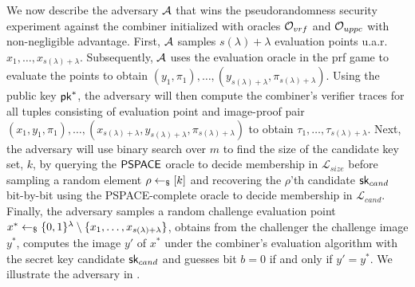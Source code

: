 We now describe the adversary $\mathcal{A}$ that wins the pseudorandomness security experiment 
against the combiner initialized with oracles $\mathcal{O}_{vrf}$ and $\mathcal{O}_{uppc}$ with non-negligible advantage.
First, $\mathcal{A}$ samples $s(\lambda) + \lambda$ evaluation points u.a.r. $x_1, \ldots, x_{s(\lambda) + \lambda}$.
Subsequently, $\mathcal{A}$ uses the evaluation oracle in the prf game to evaluate the points to obtain 
$(y_1, \pi_1), \ldots, (y_{s(\lambda) + \lambda}, \pi_{s(\lambda) + \lambda})$. Using the public key $\textup{\textsf{pk}}^*$,
the adversary will then compute the combiner's verifier traces for all tuples consisting of evaluation point and image-proof pair
$(x_1, y_1, \pi_1), \ldots, (x_{s(\lambda) + \lambda}, y_{s(\lambda) + \lambda}, \pi_{s(\lambda) + \lambda})$ to obtain 
$\tau_1, \ldots, \tau_{s(\lambda) + \lambda}$. Next, the adversary will use binary search over $m$ to find the size 
of the candidate key set, $k$, by querying the $\textup{\textsf{PSPACE}}$ oracle to decide membership in $\mathcal L_{size}$ before 
sampling a random element $\rho \gets_\$ [k]$ and recovering the $\rho$'th candidate $\textup{\textsf{sk}}_{cand}$ bit-by-bit using the PSPACE-complete oracle
to decide membership in $\mathcal L_{cand}$.
Finally, the adversary samples a random challenge evaluation point $x^* \gets_\$ \{0,1\}^\lambda \setminus \{x_1, \ldots, x_{s(\lambda) + \lambda}\}$,
obtains from the challenger the challenge image $y^*$, computes the image $y'$ of $x^*$ under the combiner's evaluation algorithm
with the secret key candidate $\textup{\textsf{sk}}_{cand}$ and guesses bit $b = 0$ if and only if $y' = y^*$.
We illustrate the adversary in .

